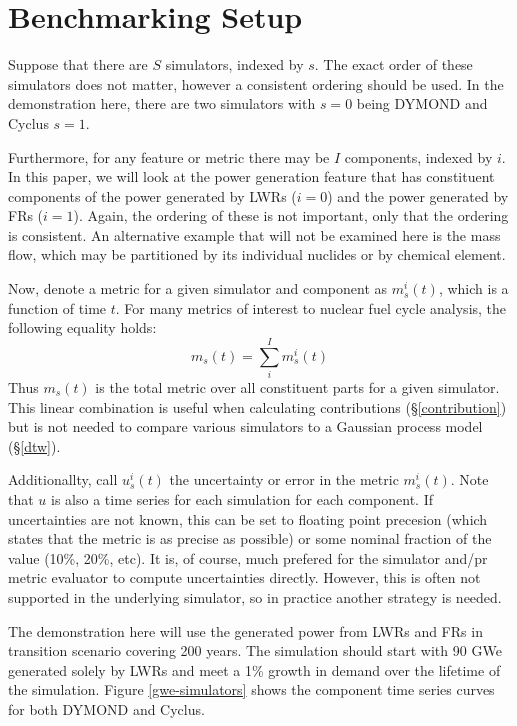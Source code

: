 \section{Benchmarking Setup}
\label{setup}

Suppose that there are $S$ simulators, indexed by $s$. The exact order 
of these simulators does not matter, however a consistent ordering should
be used. In the demonstration here, there are two simulators with $s=0$
being DYMOND and Cyclus $s=1$.

Furthermore, for any feature or metric there may be $I$ components, 
indexed by $i$. In this paper, we will look at the power generation feature
that has constituent components of the power generated by LWRs ($i=0$) and
the power generated by FRs ($i=1$).  Again, the ordering of these is not 
important, only that the ordering is consistent. An alternative example
that will not be examined here is the mass flow, which may be partitioned 
by its individual nuclides or by chemical element.

Now, denote a metric for a given simulator and component as 
$m_s^i(t)$, which is a function of time $t$. For many metrics of interest 
to nuclear fuel cycle analysis, the following equality holds:
\begin{equation}
m_s(t) = \sum_i^I m_s^i(t)
\end{equation}
Thus $m_s(t)$ is the total metric over all constituent parts for a given 
simulator. This linear combination is useful when calculating contributions
(\S \ref{contribution}) but is not needed to compare various simulators
to a Gaussian process model (\S \ref{dtw}).

Additionallty, call $u_s^i(t)$ the uncertainty or error in the metric 
$m_s^i(t)$. Note that $u$ is also a time series for each simulation for 
each component. If uncertainties are not known, this can be set to floating
point precesion (which states that the metric is as precise as possible) or
some nominal fraction of the value (10\%, 20\%, etc). It is, of course, 
much prefered for the simulator and/pr metric evaluator to compute 
uncertainties directly. However, this is often not supported in the underlying
simulator, so in practice another strategy is needed.  

The demonstration here will use the generated power from LWRs and FRs in 
transition scenario covering 200 years. The simulation should start with
90 GWe generated solely by LWRs and meet a 1\% growth in demand over the 
lifetime of the simulation. Figure \ref{gwe-simulators} shows the component time 
series curves for both DYMOND and Cyclus.

